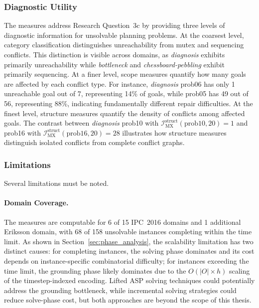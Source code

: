 \subsubsection{Diagnostic Utility}

The measures address Research Question~3c by providing three levels of diagnostic information for unsolvable planning problems. At the coarsest level, category classification distinguishes unreachability from mutex and sequencing conflicts. This distinction is visible across domains, as \textit{diagnosis} exhibits primarily unreachability while \textit{bottleneck} and \textit{chessboard-pebbling} exhibit primarily sequencing. At a finer level, scope measures quantify how many goals are affected by each conflict type. For instance, \textit{diagnosis} prob06 has only 1 unreachable goal out of 7, representing 14\% of goals, while prob05 has 49 out of 56, representing 88\%, indicating fundamentally different repair difficulties. At the finest level, structure measures quantify the density of conflicts among affected goals. The contrast between \textit{diagnosis} prob10 with $\mathcal{I}^{\text{struct}}_{\text{MX}}(\text{prob10}, 20) = 1$ and prob16 with $\mathcal{I}^{\text{struct}}_{\text{MX}}(\text{prob16}, 20) = 28$ illustrates how structure measures distinguish isolated conflicts from complete conflict graphs.

\subsubsection{Limitations}

Several limitations must be noted.

\paragraph{Domain Coverage.} The measures are computable for 6 of 15 \ac{IPC}~2016 domains and 1 additional Eriksson domain, with 68 of 158 unsolvable instances completing within the time limit. As shown in Section~\ref{sec:phase_analysis}, the scalability limitation has two distinct causes: for completing instances, the solving phase dominates and its cost depends on instance-specific combinatorial difficulty; for instances exceeding the time limit, the grounding phase likely dominates due to the $O(|O| \times h)$ scaling of the timestep-indexed encoding. Lifted \ac{ASP} solving techniques could potentially address the grounding bottleneck, while incremental solving strategies could reduce solve-phase cost, but both approaches are beyond the scope of this thesis.

